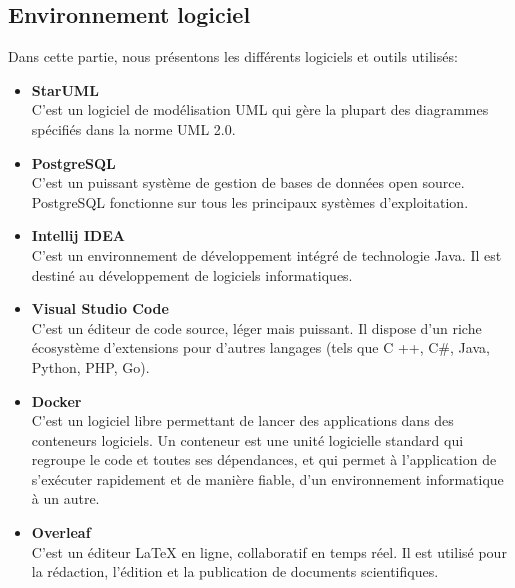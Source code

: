 \subsection{Environnement logiciel}
Dans cette partie, nous présentons les différents logiciels et outils utilisés:
\begin{itemize}
    \item \textbf{StarUML} \\
    C'est un logiciel de modélisation UML qui gère la plupart des diagrammes spécifiés dans la norme UML 2.0.
    \item \textbf{PostgreSQL}\\
    C'est un puissant système de gestion de bases de données open source. PostgreSQL fonctionne sur tous les principaux systèmes d'exploitation.
    \item \textbf{Intellij IDEA}\\
    C'est un environnement de développement intégré de technologie Java. Il est destiné au développement de logiciels informatiques.
    \item \textbf{Visual Studio Code}\\
    C'est un éditeur de code source, léger mais puissant. Il dispose d'un riche écosystème d'extensions pour d'autres langages (tels que C ++, C\#, Java, Python, PHP, Go).
    \item \textbf{Docker}\\
    C'est un logiciel libre permettant de lancer des applications dans des conteneurs logiciels. Un conteneur est une unité logicielle standard qui regroupe le code et toutes ses dépendances, et qui permet à l'application de s'exécuter rapidement et de manière fiable, d'un environnement informatique à un autre.
    \item \textbf{Overleaf}\\
    C'est un éditeur LaTeX en ligne, collaboratif en temps réel. Il est utilisé pour la rédaction, l'édition et la publication de documents scientifiques.
\end{itemize}
